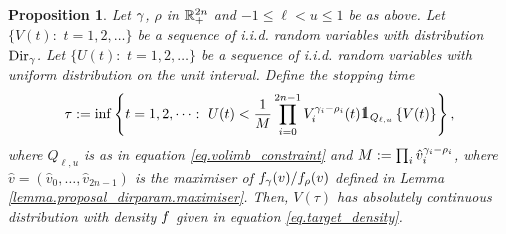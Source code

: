 \documentclass[10pt]{article}
\newtheorem{prop}[thm]{Proposition}
\begin{document}
\begin{prop}\label{prop.rejection_sampling}
 Let $\dirparam$, $\rho$ in $\R_{+}^{2n}$ and $-1\leq \ell < u \leq 1$ be as above. 
 Let $\lbrace V(t): \, \, t=1,2,\dots \rbrace$ be a sequence of i.i.d. random variables with distribution $\text{Dir}_{\dirparam}$. Let $\lbrace U(t): \, \, t=1,2,\dots \rbrace$ be a sequence of i.i.d. random variables with uniform distribution on the unit interval. Define the stopping time 
 \begin{equation*}
  \tau := \inf \left\lbrace 
  t=1,2,\dots : \, \, 
  U(t)<\frac{1}{M} \prod_{i=0}^{2n-1} V_{i}^{\dirparam_i - \rho_i}(t)
  \one_{Q_{\ell,u}}\left\lbrace V(t)\right\rbrace
  \right\rbrace,
 \end{equation*}
where $Q_{\ell,u}$ is as in equation \eqref{eq.volimb_constraint} and $M:= \prod_i \hat{v}_{i}^{\dirparam_i - \rho_i}$, where $\hat{v} = (\hat{v}_0,\dots,\hat{v}_{2n-1})$ is the maximiser of $\dirichletDensity[\dirparam](v)/\dirichletDensity[\rho](v)$ defined in Lemma \ref{lemma.proposal_dirparam.maximiser}. Then, $V(\tau)$ has absolutely continuous distribution with density $\targetDensity$ given in equation \eqref{eq.target_density}.
\end{prop}
\end{document}
